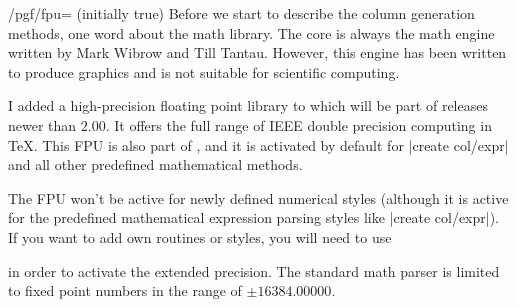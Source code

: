 \begin{key}{/pgf/fpu= (initially true)}
    Before we start to describe the column generation methods, one word about
    the math library. The core is always the \PGF{} math engine written by Mark
    Wibrow and Till Tantau. However, this engine has been written to produce
    graphics and is not suitable for scientific computing.

    I added a high-precision floating point library to \PGF{} which will be
    part of releases newer than \PGF{} $2.00$. It offers the full range of IEEE
    double precision computing in \TeX. This FPU is also part of
    \PGFPlotstable{}, and it is activated by default for |create col/expr| and
    all other predefined mathematical methods.

    The FPU won't be active for newly defined numerical styles (although it is
    active for the predefined mathematical expression parsing styles like
    |create col/expr|). If you want to add own routines or styles, you will
    need to use
\begin{codeexample}
\end{codeexample}
    \noindent in order to activate the extended precision. The standard math
    parser is limited to fixed point numbers in the range of $\pm 16384.00000$.
\end{key}

